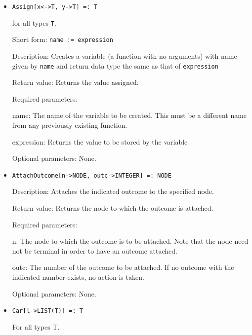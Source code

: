 \begin{itemize}
\item 
\protect \large \begin{verbatim}
Assign[x<->T, y->T] =: T
\end{verbatim} \normalsize
for all types {\tt T}.
\bd
\item
[Short form:] \verb+name := expression+
\item
[Description:] Creates a variable (a function with no arguments) with name
given by \verb+name+ and return data type the same as that of
\verb+expression+
\item
[Return value:] Returns the value assigned.
\item
[Required parameters:]\hfil\null
\bd
\item
[name:] The name of the variable to be created.  This must be a different
name from any previously existing function.  
\item
[expression:] Returns the value to be stored by the variable
\ed
\item
[Optional parameters:] None.
\ed

\item
\protect \large \begin{verbatim}
AttachOutcome[n->NODE, outc->INTEGER] =: NODE
\end{verbatim}\normalsize

\bd
\item
[Description:] Attaches the indicated outcome to the specified node.
\item
[Return value:] Returns the node to which the outcome is attached.
\item
[Required parameters:]\hfil\null

\bd
\item
[n:] The node to which the outcome is to be attached.  Note that the
node need not be terminal in order to have an outcome attached.
\item
[outc:] The number of the outcome to be attached.  If no outcome with
the indicated number exists, no action is taken.
\ed

\item
[Optional parameters:] None.
\ed



\item
\protect \large \begin{verbatim}
Car[l->LIST(T)] =: T
\end{verbatim}\normalsize

For all types T.


\end{itemize}
